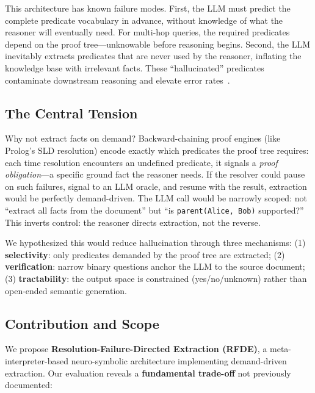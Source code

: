 \documentclass[11pt,letterpaper]{article}
\begin{document}
This architecture has known failure modes. First, the LLM must predict the complete predicate vocabulary in advance, without knowledge of what the reasoner will eventually need. For multi-hop queries, the required predicates depend on the proof tree---unknowable before reasoning begins. Second, the LLM inevitably extracts predicates that are never used by the reasoner, inflating the knowledge base with irrelevant facts. These ``hallucinated'' predicates contaminate downstream reasoning and elevate error rates~\citep{Olausson2023,Min2023}.

\subsection*{The Central Tension}

Why not extract facts on demand? Backward-chaining proof engines (like Prolog's SLD resolution) encode exactly which predicates the proof tree requires: each time resolution encounters an undefined predicate, it signals a \emph{proof obligation}---a specific ground fact the reasoner needs. If the resolver could pause on such failures, signal to an LLM oracle, and resume with the result, extraction would be perfectly demand-driven. The LLM call would be narrowly scoped: not ``extract all facts from the document'' but ``is \texttt{parent(Alice, Bob)} supported?'' This inverts control: the reasoner directs extraction, not the reverse.

We hypothesized this would reduce hallucination through three mechanisms: (1) \textbf{selectivity}: only predicates demanded by the proof tree are extracted; (2) \textbf{verification}: narrow binary questions anchor the LLM to the source document; (3) \textbf{tractability}: the output space is constrained (yes/no/unknown) rather than open-ended semantic generation.

\subsection*{Contribution and Scope}

We propose \textbf{Resolution-Failure-Directed Extraction (RFDE)}, a meta-interpreter-based neuro-symbolic architecture implementing demand-driven extraction. Our evaluation reveals a \textbf{fundamental trade-off} not previously documented:
\end{document}
